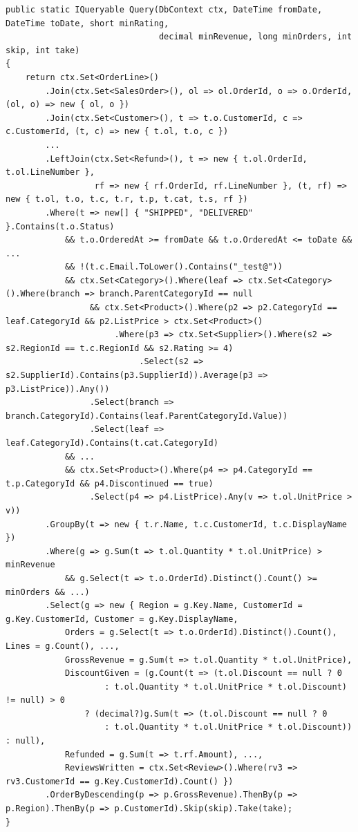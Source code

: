 \begin{lstlisting}[language={[Sharp]C},caption={Příklad~3, výstup (výňatek): metoda dotazu v~LINQ pro EF~Core.},label={lst:ex3-out}]
public static IQueryable Query(DbContext ctx, DateTime fromDate, DateTime toDate, short minRating,
                               decimal minRevenue, long minOrders, int skip, int take)
{
    return ctx.Set<OrderLine>()
        .Join(ctx.Set<SalesOrder>(), ol => ol.OrderId, o => o.OrderId, (ol, o) => new { ol, o })
        .Join(ctx.Set<Customer>(), t => t.o.CustomerId, c => c.CustomerId, (t, c) => new { t.ol, t.o, c })
        ...
        .LeftJoin(ctx.Set<Refund>(), t => new { t.ol.OrderId, t.ol.LineNumber },
                  rf => new { rf.OrderId, rf.LineNumber }, (t, rf) => new { t.ol, t.o, t.c, t.r, t.p, t.cat, t.s, rf })
        .Where(t => new[] { "SHIPPED", "DELIVERED" }.Contains(t.o.Status)
            && t.o.OrderedAt >= fromDate && t.o.OrderedAt <= toDate && ...
            && !(t.c.Email.ToLower().Contains("_test@"))
            && ctx.Set<Category>().Where(leaf => ctx.Set<Category>().Where(branch => branch.ParentCategoryId == null
                 && ctx.Set<Product>().Where(p2 => p2.CategoryId == leaf.CategoryId && p2.ListPrice > ctx.Set<Product>()
                      .Where(p3 => ctx.Set<Supplier>().Where(s2 => s2.RegionId == t.c.RegionId && s2.Rating >= 4)
                           .Select(s2 => s2.SupplierId).Contains(p3.SupplierId)).Average(p3 => p3.ListPrice)).Any())
                 .Select(branch => branch.CategoryId).Contains(leaf.ParentCategoryId.Value))
                 .Select(leaf => leaf.CategoryId).Contains(t.cat.CategoryId)
            && ...
            && ctx.Set<Product>().Where(p4 => p4.CategoryId == t.p.CategoryId && p4.Discontinued == true)
                 .Select(p4 => p4.ListPrice).Any(v => t.ol.UnitPrice > v))
        .GroupBy(t => new { t.r.Name, t.c.CustomerId, t.c.DisplayName })
        .Where(g => g.Sum(t => t.ol.Quantity * t.ol.UnitPrice) > minRevenue
            && g.Select(t => t.o.OrderId).Distinct().Count() >= minOrders && ...)
        .Select(g => new { Region = g.Key.Name, CustomerId = g.Key.CustomerId, Customer = g.Key.DisplayName,
            Orders = g.Select(t => t.o.OrderId).Distinct().Count(), Lines = g.Count(), ...,
            GrossRevenue = g.Sum(t => t.ol.Quantity * t.ol.UnitPrice),
            DiscountGiven = (g.Count(t => (t.ol.Discount == null ? 0
                    : t.ol.Quantity * t.ol.UnitPrice * t.ol.Discount) != null) > 0
                ? (decimal?)g.Sum(t => (t.ol.Discount == null ? 0
                    : t.ol.Quantity * t.ol.UnitPrice * t.ol.Discount)) : null),
            Refunded = g.Sum(t => t.rf.Amount), ...,
            ReviewsWritten = ctx.Set<Review>().Where(rv3 => rv3.CustomerId == g.Key.CustomerId).Count() })
        .OrderByDescending(p => p.GrossRevenue).ThenBy(p => p.Region).ThenBy(p => p.CustomerId).Skip(skip).Take(take);
}
\end{lstlisting}

